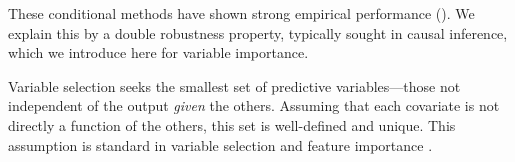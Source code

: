 \documentclass{article}
\theoremstyle{plain}
\theoremstyle{definition}
\theoremstyle{remark}
\newcommand{\indep}{\perp\!\!\!\perp}
\begin{document}
These conditional methods have shown strong empirical performance (\citet{chamma2024statistically, chamma2024variable, paillard2025measuringvariableimportanceheterogeneous}). We explain this by a double robustness property, typically sought in causal inference, which we introduce here for variable importance.


Variable selection seeks the smallest set of predictive variables—those not independent of the output \textit{given} the others.
%
%
Assuming that each covariate is not directly a function of the others, this set is well-defined and unique.
This assumption is standard in variable selection \citep{candes2017panninggoldmodelxknockoffs} and feature importance \citep{locoVSShapley}. 
%
\end{document}

